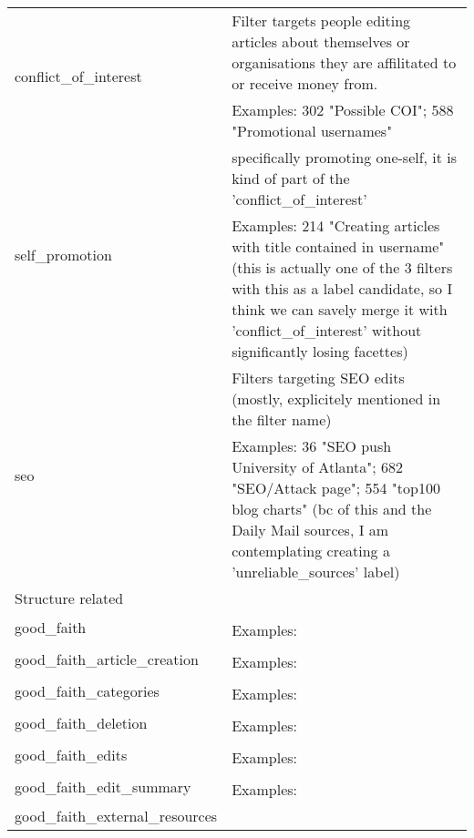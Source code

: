 \begin{longtable}{ | p{5cm} | p{9cm} | }
    \hline
    \multirow{2}{*}{conflict\_of\_interest} & Filter targets people editing articles about themselves or organisations they are affilitated to or receive money from.\\
                                     & Examples: 302 "Possible COI"; 588 "Promotional usernames"\\
    \hline
    \multirow{2}{*}{self\_promotion} & specifically promoting one-self, it is kind of part of the 'conflict\_of\_interest'\\
                                     & Examples: 214 "Creating articles with title contained in username" (this is actually one of the 3 filters with this as a label candidate, so I think we can savely merge it with 'conflict\_of\_interest' without significantly losing facettes)\\
    \hline
    \multirow{2}{*}{seo} & Filters targeting SEO edits (mostly, explicitely mentioned in the filter name)\\
                                     & Examples: 36 "SEO push University of Atlanta"; 682 "SEO/Attack page"; 554 "top100 blog charts" (bc of this and the Daily Mail sources, I am contemplating creating a 'unreliable\_sources' label)\\
    \hline \hline
        \multicolumn{2}{|l|}{Structure related} \\
    \hline
    \multirow{2}{*}{good\_faith} & \\
                                     & Examples:\\
    \hline
    \multirow{2}{*}{good\_faith\_article\_creation} & \\
                                     & Examples:\\
    \hline
    \multirow{2}{*}{good\_faith\_categories} & \\
                                     & Examples:\\
    \hline
    \multirow{2}{*}{good\_faith\_deletion} & \\
                                     & Examples:\\
    \hline
    \multirow{2}{*}{good\_faith\_edits} & \\
                                     & Examples:\\
    \hline
    \multirow{2}{*}{good\_faith\_edit\_summary} & \\
                                     & Examples:\\
    \hline
    \multirow{2}{*}{good\_faith\_external\_resources} & \\

\end{longtable}
